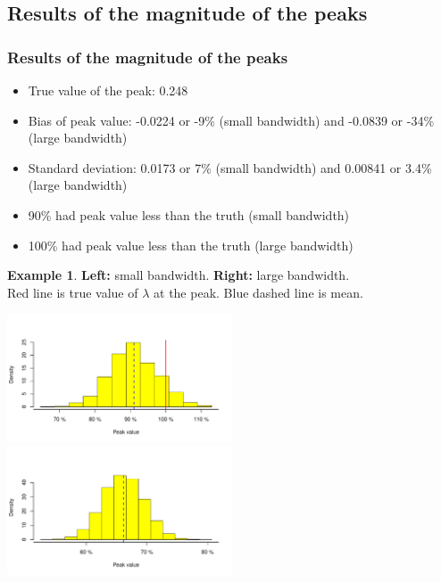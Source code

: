\documentclass[notheorems]{beamer}
\theoremstyle{definition}
\theoremstyle{example}
\newtheorem{example}{Example}
\begin{document}
\subsection{Results of the magnitude of the peaks}
\begin{frame}\frametitle{Results of the magnitude of the peaks}
    \footnotesize
    \begin{itemize}
        \item True value of the peak: 0.248
        \item Bias of peak value: -0.0224 or -9\% (small bandwidth) and -0.0839 or -34\% (large bandwidth)
        \item Standard deviation: 0.0173 or 7\% (small bandwidth) and 0.00841 or 3.4\% (large bandwidth)
        \item 90\% had peak value \alert{less than} the truth (small bandwidth)
        \item 100\% had peak value \alert{less than} the truth (large bandwidth)
    \end{itemize}
    \begin{example}{\tiny{\textbf{Left:} small bandwidth. \textbf{Right:} large bandwidth. \\
    {\color{red}Red} line is true value of $\lambda$ at the peak. {\color{blue}Blue dashed} line is mean.}}
    \centerline{
        \label{fig:peaks-values-hist}
        \centering
        \includegraphics[width=0.5\textwidth]{peaks-hist-values-undersmooth}
        \includegraphics[width=0.5\textwidth]{peaks-hist-values-oversmooth}
     }
    \end{example}
\end{frame}
\end{document}

